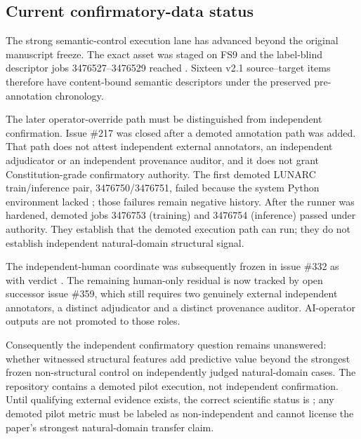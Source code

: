 \subsection{Current confirmatory-data status}\label{sec:natural-lane}

The strong semantic-control execution lane has advanced beyond the original
manuscript freeze. The exact  asset was staged
on FS9 and the label-blind descriptor jobs 3476527--3476529 reached
. Sixteen v2.1 source--target items therefore
have content-bound semantic descriptors under the preserved pre-annotation
chronology.

The later operator-override path must be distinguished from independent
confirmation. Issue \#217 was closed after a demoted
 annotation path was added. That path does
not attest independent external annotators, an independent adjudicator or an
independent provenance auditor, and it does not grant Constitution-grade
confirmatory authority. The first demoted LUNARC train/inference pair,
3476750/3476751, failed because the system Python environment lacked
; those failures remain negative history. After the runner was
hardened, demoted jobs 3476753 (training) and 3476754 (inference) passed under
 authority. They establish that the demoted execution
path can run; they do not establish independent natural-domain structural
signal.

The independent-human coordinate was subsequently frozen in issue \#332 as
 with verdict
. The
remaining human-only residual is now tracked by open successor issue \#359,
which still requires two genuinely external independent annotators, a distinct
adjudicator and a distinct provenance auditor. AI-operator outputs are not
promoted to those roles.

Consequently the independent confirmatory question remains unanswered: whether
witnessed structural features add predictive value beyond the strongest frozen
non-structural control on independently judged natural-domain cases. The
repository contains a demoted pilot execution, not independent confirmation.
Until qualifying external evidence exists, the correct scientific status is
; any demoted pilot metric must be labeled
as non-independent and cannot license the paper's strongest natural-domain
transfer claim.

